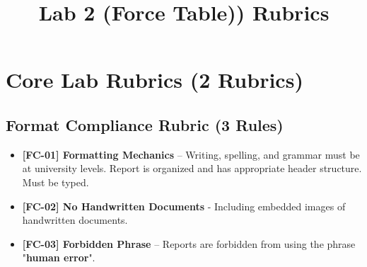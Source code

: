 \documentclass{article}
\begin{document}
\pagestyle{empty}

\title{Lab 2 (Force Table)) Rubrics}

\section*{Core Lab Rubrics (2 Rubrics)}

\subsection*{Format Compliance Rubric (3 Rules)}
\begin{itemize}
\item \textbf{ [FC-01] Formatting Mechanics } – Writing, spelling, and grammar must be at university levels. Report is organized and has appropriate header structure. Must be typed.
\item \textbf{ [FC-02] No Handwritten Documents } - Including embedded images of handwritten documents.
\item \textbf{ [FC-03] Forbidden Phrase } – Reports are forbidden from using the phrase "\textbf{human error}". 
\end{itemize}
\end{document}
